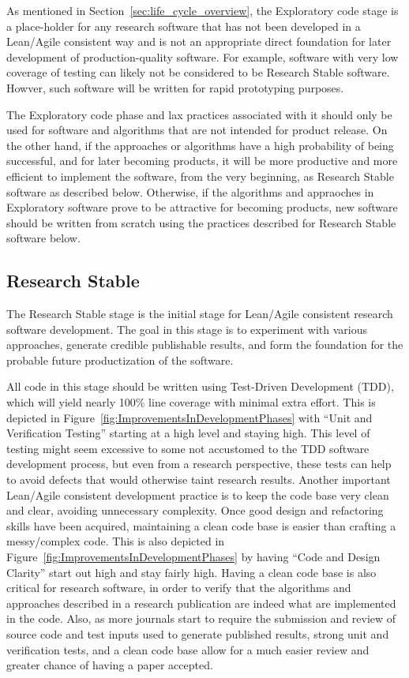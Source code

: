\documentclass[11pt]{SANDreport}
\begin{document}
As mentioned in Section~\ref{sec:life_cycle_overview}, the Exploratory
code stage is a place-holder for any research software that has not
been developed in a Lean/Agile consistent way and is not an
appropriate direct foundation for later development of
production-quality software.  For example, software with very low
coverage of testing can likely not be considered to be Research Stable
software.  Howver, such software will be written for rapid prototyping
purposes.

The Exploratory code phase and lax practices associated with it should
only be used for software and algorithms that are not intended for product
release.  On the other hand, if the approaches or algorithms have a
high probability of being successful, and for later becoming products, it 
will be more productive and more efficient
to implement the software, from the very beginning, as Research Stable
software as described below.  Otherwise, if the algorithms and
appraoches in Exploratory software prove to be attractive for
becoming products, new software should be written from scratch using
the practices described for Research Stable software below.


%
{}\subsection{Research Stable}
\label{sec:research_stable_code}
%

The Research Stable stage is the initial stage for Lean/Agile
consistent research software development.  The goal in this stage is
to experiment with various approaches, generate credible publishable
results, and form the foundation for the probable future
productization of the software.

All code in this stage should be written using Test-Driven Development
(TDD), which will yield nearly 100\% line coverage with minimal extra
effort.  This is depicted in
Figure~\ref{fig:ImprovementsInDevelopmentPhases} with ``Unit and
Verification Testing'' starting at a high level and staying high.
This level of testing might seem excessive to some not accustomed to
the TDD software development process, but even from a research
perspective, these tests can help to avoid defects that would
otherwise taint research results.  Another important Lean/Agile
consistent development practice is to keep the code base very clean
and clear, avoiding unnecessary complexity.  Once good design and
refactoring skills have been acquired, maintaining a clean code base is
easier than crafting a messy/complex code.  This is also depicted in
Figure~\ref{fig:ImprovementsInDevelopmentPhases} by having ``Code and
Design Clarity'' start out high and stay fairly high.  Having a clean
code base is also critical for research software, in order to
verify that the algorithms and approaches described in a research
publication are indeed what are implemented in the code.  Also, as
more journals start to require the submission and review of source code
and test inputs used to generate published results, strong unit and
verification tests, and a clean code base allow for a much easier
review and greater chance of having a paper accepted.  
\end{document}

